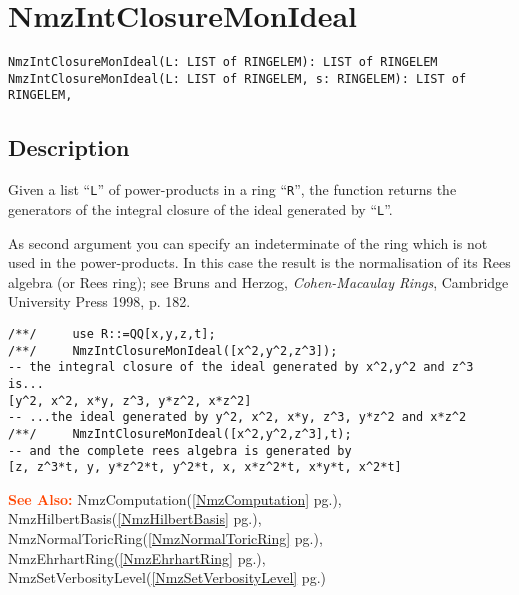 \documentclass[a4paper]{mybook}
\newenvironment{command}{}{} %
\newcommand\SeeAlso{\par\textcolor{OrangeRed}{\textbf{\large See Also: }}}
\begin{document}
\section{NmzIntClosureMonIdeal}
\label{NmzIntClosureMonIdeal}
\begin{command} %


\begin{Verbatim}[label=syntax, rulecolor=\color{MidnightBlue},
frame=single]
NmzIntClosureMonIdeal(L: LIST of RINGELEM): LIST of RINGELEM
NmzIntClosureMonIdeal(L: LIST of RINGELEM, s: RINGELEM): LIST of RINGELEM,
\end{Verbatim}


\subsection*{Description}

Given a list ``\verb&L&'' of power-products in a ring ``\verb&R&'', the function returns the
generators of the integral closure of the ideal generated by ``\verb&L&''.

As second argument you can specify an indeterminate of the ring which is
not used in the power-products.  In this case the result is the
normalisation of its Rees algebra (or Rees ring); see Bruns and Herzog,
\textit{Cohen-Macaulay Rings}, Cambridge University Press 1998, p. 182.
\begin{Verbatim}[label=example, rulecolor=\color{PineGreen}, frame=single]
/**/     use R::=QQ[x,y,z,t];
/**/     NmzIntClosureMonIdeal([x^2,y^2,z^3]);
-- the integral closure of the ideal generated by x^2,y^2 and z^3 is...
[y^2, x^2, x*y, z^3, y*z^2, x*z^2]
-- ...the ideal generated by y^2, x^2, x*y, z^3, y*z^2 and x*z^2
/**/     NmzIntClosureMonIdeal([x^2,y^2,z^3],t);
-- and the complete rees algebra is generated by
[z, z^3*t, y, y*z^2*t, y^2*t, x, x*z^2*t, x*y*t, x^2*t]
\end{Verbatim}


\SeeAlso %
  NmzComputation(\ref{NmzComputation} pg.\pageref{NmzComputation}), 
    NmzHilbertBasis(\ref{NmzHilbertBasis} pg.\pageref{NmzHilbertBasis}), 
    NmzNormalToricRing(\ref{NmzNormalToricRing} pg.\pageref{NmzNormalToricRing}), 
    NmzEhrhartRing(\ref{NmzEhrhartRing} pg.\pageref{NmzEhrhartRing}), 
    NmzSetVerbosityLevel(\ref{NmzSetVerbosityLevel} pg.\pageref{NmzSetVerbosityLevel})
\end{command} %
\end{document}
